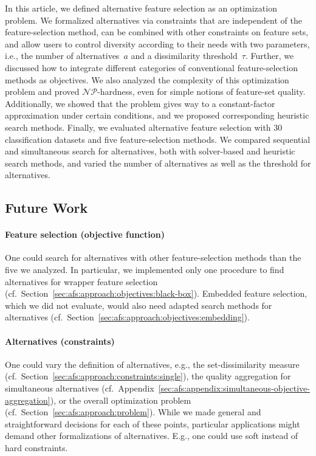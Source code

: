 \documentclass{article}
\theoremstyle{definition}
\begin{document}
In this article, we defined alternative feature selection as an optimization problem.
We formalized alternatives via constraints that are independent of the feature-selection method, can be combined with other constraints on feature sets, and allow users to control diversity according to their needs with two parameters, i.e., the number of alternatives~$a$ and a dissimilarity threshold~$\tau$.
Further, we discussed how to integrate different categories of conventional feature-selection methods as objectives.
We also analyzed the complexity of this optimization problem and proved $\mathcal{NP}$-hardness, even for simple notions of feature-set quality.
Additionally, we showed that the problem gives way to a constant-factor approximation under certain conditions, and we proposed corresponding heuristic search methods.
Finally, we evaluated alternative feature selection with 30 classification datasets and five feature-selection methods.
We compared sequential and simultaneous search for alternatives, both with solver-based and heuristic search methods, and varied the number of alternatives as well as the threshold for alternatives.

\subsection{Future Work}
\label{sec:afs:conclusion:future-work}

\paragraph{Feature selection (objective function)}

One could search for alternatives with other feature-selection methods than the five we analyzed.
In particular, we implemented only one procedure to find alternatives for wrapper feature selection (cf.~Section~\ref{sec:afs:approach:objectives:black-box}).
Embedded feature selection, which we did not evaluate, would also need adapted search methods for alternatives (cf.~Section~\ref{sec:afs:approach:objectives:embedding}).

\paragraph{Alternatives (constraints)}

One could vary the definition of alternatives, e.g., the set-dissimilarity measure (cf.~Section~\ref{sec:afs:approach:constraints:single}), the quality aggregation for simultaneous alternatives (cf.~Appendix~\ref{sec:afs:appendix:simultaneous-objective-aggregation}), or the overall optimization problem (cf.~Section~\ref{sec:afs:approach:problem}).
While we made general and straightforward decisions for each of these points, particular applications might demand other formalizations of alternatives.
E.g., one could use soft instead of hard constraints.
\end{document}
